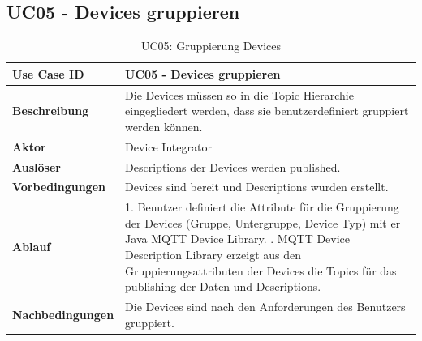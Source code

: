 \subsection{UC05 - Devices gruppieren}

\begin{table}[H]
\begin{tabularx}{\textwidth}{|l|X|}

 \hline
 {\bf Use Case ID }    & UC05 - Devices gruppieren \\  \hline
 {\bf Beschreibung }   & Die Devices müssen so in die Topic Hierarchie eingegliedert werden, dass sie benutzerdefiniert gruppiert werden können. \\ \hline
 {\bf Aktor }          & Device Integrator \\ \hline
 {\bf Auslöser }       & Descriptions der Devices werden published. \\ \hline
 {\bf Vorbedingungen } & Devices sind bereit und Descriptions wurden erstellt. \\ \hline
 {\bf Ablauf }         & 
  1. Benutzer definiert die Attribute für die Gruppierung der Devices (Gruppe, Untergruppe, Device Typ) mit er Java MQTT Device Library. \newline
  2. MQTT Device Description Library erzeigt aus den Gruppierungsattributen der Devices die Topics für das publishing der Daten und Descriptions. \\ \hline
 {\bf Nachbedingungen} & Die Devices sind nach den Anforderungen des Benutzers gruppiert. \\ \hline
  
\end{tabularx}
\caption{UC05: Gruppierung Devices}
\end{table}

